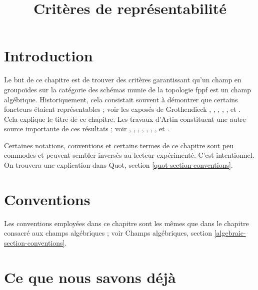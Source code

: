

%


\title{Critères de représentabilité}

\maketitle

\label{section-phantom}

\tableofcontents




\section{Introduction}
\label{section-introduction}

\noindent
Le but de ce chapitre est de trouver des critères garantissant qu'un
champ en groupoïdes sur la catégorie des schémas munie de la topologie fppf
est un champ algébrique. Historiquement, cela consistait souvent à démontrer que
certains foncteurs étaient représentables ; voir les exposés de Grothendieck
\cite{Gr-I},
\cite{Gr-II},
\cite{Gr-III},
\cite{Gr-IV},
\cite{Gr-V}, et
\cite{Gr-VI}.
Cela explique le titre de ce chapitre. Les travaux d'Artin constituent une autre
source importante de ces résultats ; voir
\cite{ArtinI},
\cite{ArtinII},
\cite{Artin-Theorem-Representability},
\cite{Artin-Construction-Techniques},
\cite{Artin-Algebraic-Spaces},
\cite{Artin-Algebraic-Approximation},
\cite{Artin-Implicit-Function}, et
\cite{ArtinVersal}.

\medskip\noindent
Certaines notations, conventions et certains termes de ce chapitre sont peu
commodes et peuvent sembler inversés au lecteur expérimenté. C'est intentionnel.
On trouvera une explication dans Quot, section
\ref{quot-section-conventions}.



\section{Conventions}
\label{section-conventions}

\noindent
Les conventions employées dans ce chapitre sont les mêmes que dans le
chapitre consacré aux champs algébriques ; voir
Champs algébriques, section \ref{algebraic-section-conventions}.




\section{Ce que nous savons déjà}
\label{section-done-so-far}

